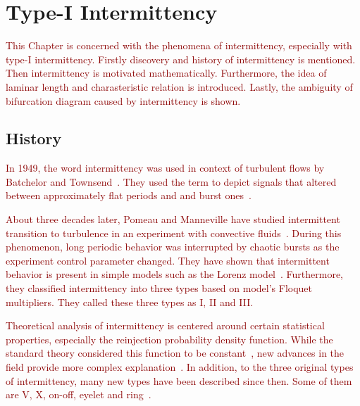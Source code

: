 \chapter{Type-I Intermittency}
\label{chap:type-I intermittency}

\textcolor{darkred}{
This Chapter is concerned with the phenomena of intermittency, especially with type-I intermittency.
Firstly discovery and history of intermittency is mentioned.
Then intermittency is motivated mathematically.
Furthermore, the idea of laminar length and charasteristic relation is introduced.
Lastly, the ambiguity of bifurcation diagram caused by intermittency is shown.
}

\section{History}
\textcolor{darkred}{
In 1949, the word intermittency was used in context of turbulent flows by Batchelor and Townsend~\cite{Batchelor19491025}.
They used the term to depict signals that altered between approximately flat periods and and burst ones~\cite{Elaskar2017}.
}
\par
\textcolor{darkred}{
About three decades later, Pomeau and Manneville have studied intermittent transition to turbulence in an experiment with convective fluids~\cite{Pomeau1980}.
During this phenomenon, long periodic behavior was interrupted by chaotic bursts as the experiment control parameter changed.
They have shown that intermittent behavior is present in simple models such as the Lorenz model~\cite{Lorenz2004}.
Furthermore, they classified intermittency into three types based on model's Floquet multipliers.
They called these three types as I, II and III.
}
\par
\textcolor{darkred}{
Theoretical analysis of intermittency is centered around certain statistical properties, especially the reinjection probability density function.
While the standard theory considered this function to be constant~\cite{Dubois1983}, new advances in the field provide more complex explanation~\cite{Elaskar2022}.
In addition, to the three original types of intermittency, many new types have been described since then.
Some of them are V, X, on-off, eyelet and ring~\cite{Elaskar2022}.
}

